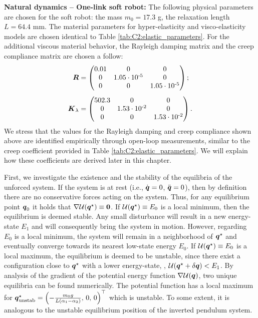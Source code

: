 \textbf{Natural dynamics -- One-link soft robot:} The following physical parameters are chosen for the soft robot: the mass $m_0 = 17.3$ g, the relaxation length $L = 64.4$ mm. The material parameters for hyper-elasticity and visco-elasticity models are chosen identical to Table \ref{tab:C2:elastic_parameters}. For the additional viscous material behavior, the Rayleigh damping matrix and the creep compliance matrix are chosen a follow:
%
\begin{align}
\boldsymbol{R} & = \begin{pmatrix} 0.01 & 0 & 0 \\ 0 &  1.05\cdot10^{\textrm{-5}} & 0 \\ 0 & 0 & 1.05\cdot10^{\textrm{-5}} \end{pmatrix}; \notag \\[0.45em]
\boldsymbol{K}_{\lambda} & = \begin{pmatrix} 502.3 & 0 & 0 \\ 0 &  1.53\cdot10^{\textrm{-2}} & 0 \\ 0 & 0 & 1.53\cdot10^{\textrm{-2}} \end{pmatrix}. \notag
\end{align}
%
\noindent  We stress that the values for the Rayleigh damping and creep compliance shown above are identified empirically {through} open-loop measurements, similar to the creep coefficient provided in Table \ref{tab:C2:elastic_parameters}.  We will explain how these coefficients are derived later in this chapter. 

%

First, we investigate the existence and the stability of the equilibria of the unforced system. If the system is at rest (i.e., ${\dot{\boldsymbol{q}}} = 0$, ${\ddot{\boldsymbol{q}}} = 0$), then by definition there are no conservative forces acting on the system. Thus, for any equilibrium point ${{\boldsymbol{q}}}_0$ it holds that $\nabla \mathcal{U}({{\boldsymbol{q}}}^\star) \equiv \boldsymbol{0}$. If $ \mathcal{U}({{\boldsymbol{q}}}^\star) \equiv E_0$ is a local minimum, then the equilibrium is deemed stable. Any small disturbance will result in a new energy-state $E_1$ and will consequently bring the system in motion. However, regarding $E_0$ is a local minimum, the system will remain in a neighborhood of ${{\boldsymbol{q}}}^\star$ and eventually converge towards its nearest low-state energy $E_0$. If $\mathcal{U}({{\boldsymbol{q}}}^\star) \equiv E_0$ is a local maximum, the equilibrium is deemed to be unstable, since there exist a configuration close to ${{\boldsymbol{q}}}^\star$ with a lower energy-state, \ie, $\mathcal{U}({{\boldsymbol{q}}}^\star + {\delta}{\boldsymbol{q}}) < E_1$. By analysis of the gradient of the potential energy function $\nabla \mathcal{U}({{\boldsymbol{q}}})$, two unique equilibria can be found numerically. The potential function has a local maximum for ${\boldsymbol{q}}^\star_{\textrm{unstab}}=\left(-\tfrac{m_0 g}{L (\alpha_1 - \alpha_2)},\,0,\,0\right)^\top$ which is unstable. To some extent, it is analogous to the unstable equilibrium position of the inverted pendulum system. 

